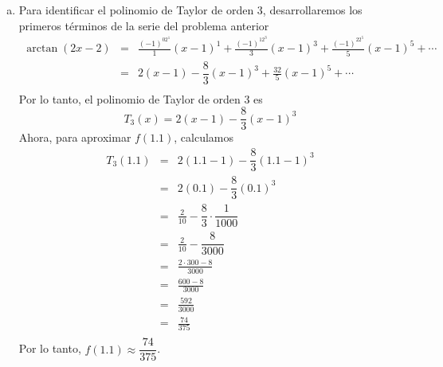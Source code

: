 \documentclass{article}
\begin{document}
\begin{enumerate}[a)]
  \item Para identificar el polinomio de Taylor de orden 3, desarrollaremos los primeros términos de la serie del problema anterior
    \begin{eqnarray*}
      \arctan(2x-2)
        &=& \frac{(-1)^02^1}{1}(x-1)^{1}+\frac{(-1)^12^3}{3}(x-1)^{3}+\frac{(-1)^22^5}{5}(x-1)^{5}+\cdots\\
        &=& 2(x-1)-\dfrac{8}{3}(x-1)^3+\frac{32}{5}(x-1)^5+\cdots\\
    \end{eqnarray*}
    Por lo tanto, el polinomio de Taylor de orden 3 es
    $$T_3(x)=2(x-1)-\dfrac{8}{3}(x-1)^3$$
    Ahora, para aproximar $f(1.1)$, calculamos
    \begin{eqnarray*}
      T_3(1.1) &=& 2(1.1-1)-\dfrac{8}{3}(1.1-1)^3\\
        &=& 2(0.1)-\dfrac{8}{3}(0.1)^3\\
        &=& \frac{2}{10}-\dfrac{8}{3}\cdot\dfrac{1}{1000}\\
        &=& \frac{2}{10}-\dfrac{8}{3000}\\
        &=& \frac{2\cdot300-8}{3000}\\
        &=& \frac{600-8}{3000}\\
        &=& \frac{592}{3000}\\
        &=& \frac{74}{375}\\
    \end{eqnarray*}
    Por lo tanto, $f(1.1)\approx\dfrac{74}{375}$.

\end{enumerate}
\end{document}
